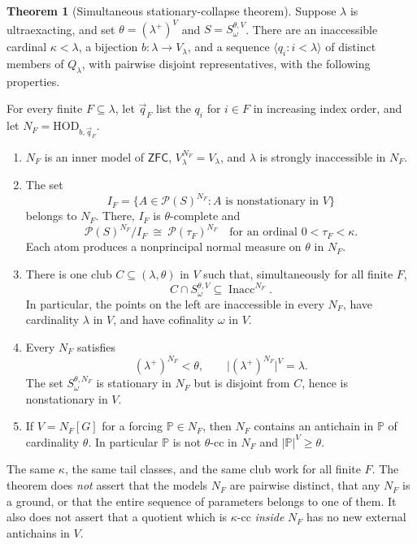 \documentclass[11pt,letterpaper]{article}
\theoremstyle{definition}
\newtheorem{theorem}[definition]{Theorem}
\numberwithin{equation}{section}
\newcommand{\ZFC}{\mathsf{ZFC}}
\newcommand{\HOD}{\mathrm{HOD}}
\newcommand{\Pow}{\mathcal P}
\newcommand{\PP}{\mathbb P}
\newcommand{\Inacc}{\operatorname{Inacc}}
\begin{document}
\begin{theorem}[Simultaneous stationary-collapse theorem]\label{thm:main}
Suppose $\lambda$ is ultraexacting, and set $\theta=(\lambda^+)^V$ and $S=S_\omega^{\theta,V}$. There are an inaccessible cardinal $\kappa<\lambda$, a bijection $b:\lambda\to V_\lambda$, and a sequence $\langle q_i:i<\lambda\rangle$ of distinct members of $Q_\lambda$, with pairwise disjoint representatives, with the following properties.

For every finite $F\subseteq\lambda$, let $\vec q_F$ list the $q_i$ for $i\in F$ in increasing index order, and let $N_F=\HOD_{b,\vec q_F}$.
\begin{enumerate}[label=\textup{(\arabic*)}]
\item $N_F$ is an inner model of $\ZFC$, $V_\lambda^{N_F}=V_\lambda$, and $\lambda$ is strongly inaccessible in $N_F$.
\item The set
\[
I_F=\{A\in\Pow(S)^{N_F}:A\text{ is nonstationary in }V\}
\]
belongs to $N_F$. There, $I_F$ is $\theta$-complete and
\[
\Pow(S)^{N_F}/I_F\ \cong\ \Pow(\tau_F)^{N_F}
\quad\text{for an ordinal }0<\tau_F<\kappa.
\]
Each atom produces a nonprincipal normal measure on $\theta$ in $N_F$.
\item There is one club $C\subseteq(\lambda,\theta)$ in $V$ such that, simultaneously for all finite $F$,
\begin{equation}\label{eq:commonclub}
C\cap S_\omega^{\theta,V}\subseteq\Inacc^{N_F}.
\end{equation}
In particular, the points on the left are inaccessible in every $N_F$, have cardinality $\lambda$ in $V$, and have cofinality $\omega$ in $V$.
\item Every $N_F$ satisfies
\begin{equation}\label{eq:successorgap}
(\lambda^+)^{N_F}<\theta,
\qquad
\bigl|(\lambda^+)^{N_F}\bigr|^V=\lambda.
\end{equation}
The set $S_\omega^{\theta,N_F}$ is stationary in $N_F$ but is disjoint from $C$, hence is nonstationary in $V$.
\item If $V=N_F[G]$ for a forcing $\PP\in N_F$, then $N_F$ contains an antichain in $\PP$ of cardinality $\theta$. In particular $\PP$ is not $\theta$-cc in $N_F$ and $|\PP|^V\geq\theta$.
\end{enumerate}
\end{theorem}

The same $\kappa$, the same tail classes, and the same club work for all finite $F$. The theorem does \emph{not} assert that the models $N_F$ are pairwise distinct, that any $N_F$ is a ground, or that the entire sequence of parameters belongs to one of them. It also does not assert that a quotient which is $\kappa$-cc \emph{inside} $N_F$ has no new external antichains in $V$.
\end{document}

